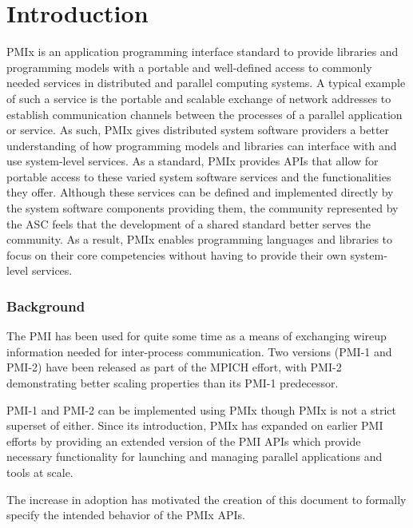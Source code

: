\chapter{Introduction}

\label{chap:intro}

\ac{PMIx} is an application programming interface standard to provide
libraries and programming models with a portable and well-defined access to commonly
needed services in distributed and parallel computing systems.
A typical example of such a service is the portable and scalable exchange of network 
addresses to establish communication channels between the processes of a parallel 
application or service.
As such, \ac{PMIx} gives distributed system software providers a better understanding of how
programming models and libraries can interface with and use system-level services.
As a standard, \ac{PMIx} provides \acp{API} that allow for
portable access to these varied system software services and the
functionalities they offer.  Although these services can be defined and implemented directly by the
system software components providing them, the 
community represented by the \ac{ASC}
feels that the development of a shared standard better serves the
community.  
As a result, \ac{PMIx} enables programming languages and libraries to focus on their core
competencies without having to provide their own system-level services.

\subsection{Background}
\label{chap:introduction:background}

The \ac{PMI} has been used for quite some time as a means of exchanging wireup information needed for inter-process communication.  
Two versions (PMI-1 and PMI-2) have been released as part of the MPICH effort, with PMI-2 demonstrating better scaling properties than its PMI-1 predecessor.

PMI-1 and PMI-2 can be implemented using \ac{PMIx} though \ac{PMIx} is not a strict superset of either.
Since its introduction, \ac{PMIx} has expanded 
on earlier \ac{PMI} efforts by 
providing an extended version of the \ac{PMI} \acp{API} which provide necessary functionality for launching and managing parallel applications and tools at scale.

The increase in adoption has motivated the creation of this document to formally specify the intended behavior of the \ac{PMIx} \acp{API}.

